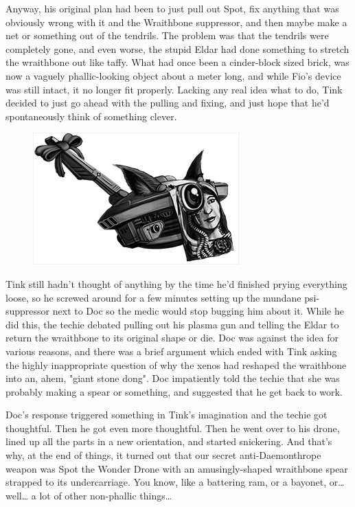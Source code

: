 Anyway, his original plan had been to just pull out Spot, fix anything that was obviously wrong with it and the Wraithbone suppressor, and then maybe make a net or something out of the tendrils. 
The problem was that the tendrils were completely gone, and even worse, the stupid Eldar had done something to stretch the wraithbone out like taffy. 
What had once been a cinder-block sized brick, was now a vaguely phallic-looking object about a meter long, and while Fio's device was still intact, it no longer fit properly. 
Lacking any real idea what to do, Tink decided to just go ahead with the pulling and fixing, and just hope that he'd spontaneously think of something clever.

\begin{figure}
	\begin{center}
		\includegraphics[width=\figwidth]{pics/16/36.png}
	\end{center}
\end{figure}
Tink still hadn't thought of anything by the time he'd finished prying everything loose, so he screwed around for a few minutes setting up the mundane psi-suppressor next to Doc so the medic would stop bugging him about it. 
While he did this, the techie debated pulling out his plasma gun and telling the Eldar to return the wraithbone to its original shape or die. 
Doc was against the idea for various reasons, and there was a brief argument which ended with Tink asking the highly inappropriate question of why the xenos had reshaped the wraithbone into an, ahem, "giant stone dong". 
Doc impatiently told the techie that she was probably making a spear or something, and suggested that he get back to work.

Doc's response triggered something in Tink's imagination and the techie got thoughtful. 
Then he got even more thoughtful. 
Then he went over to his drone, lined up all the parts in a new orientation, and started snickering. 
And that's why, at the end of things, it turned out that our secret anti-Daemonthrope weapon was Spot the Wonder Drone with an amusingly-shaped wraithbone spear strapped to its undercarriage. 
You know, like a battering ram, or a bayonet, or… well… a lot of other non-phallic things…

